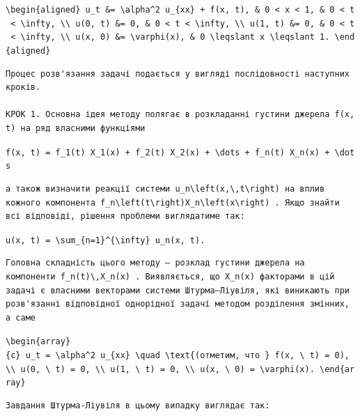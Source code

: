 \documentclass[
  ukrainian,
]{article}
\begin{document}
\texttt{\textbackslash{}begin\{aligned\}\ u\_t\ \&=\ \textbackslash{}alpha\^{}2\ u\_\{xx\}\ +\ f(x,\ t),\ \&\ 0\ \textless{}\ x\ \textless{}\ 1,\ \&\ 0\ \textless{}\ t\ \textless{}\ \textbackslash{}infty,\ \textbackslash{}\textbackslash{}\ u(0,\ t)\ \&=\ 0,\ \&\ 0\ \textless{}\ t\ \textless{}\ \textbackslash{}infty,\ \textbackslash{}\textbackslash{}\ u(1,\ t)\ \&=\ 0,\ \&\ 0\ \textless{}\ t\ \textless{}\ \textbackslash{}infty,\ \textbackslash{}\textbackslash{}\ u(x,\ 0)\ \&=\ \textbackslash{}varphi(x),\ \&\ 0\ \textbackslash{}leqslant\ x\ \textbackslash{}leqslant\ 1.\ \textbackslash{}end\{aligned\}}

\begin{verbatim}
Процес розв'язання задачі подається у вигляді послідовності наступних кроків.

КРОК 1. Основна ідея методу полягає в розкладанні густини джерела f(x, t) на ряд власними функціями
\end{verbatim}

\texttt{f(x,\ t)\ =\ f\_1(t)\ X\_1(x)\ +\ f\_2(t)\ X\_2(x)\ +\ \textbackslash{}dots\ +\ f\_n(t)\ X\_n(x)\ +\ \textbackslash{}dots}

\begin{verbatim}
а також визначити реакції системи u_n\left(x,\,t\right) на вплив кожного компонента f_n\left(t\right)X_n\left(x\right) . Якщо знайти всі відповіді, рішення проблеми виглядатиме так:
\end{verbatim}

\texttt{u(x,\ t)\ =\ \textbackslash{}sum\_\{n=1\}\^{}\{\textbackslash{}infty\}\ u\_n(x,\ t).}

\begin{verbatim}
Головна складність цього методу — розклад густини джерела на компоненти f_n(t)\,X_n(x) . Виявляється, що X_n(x) факторами в цій задачі є власними векторами системи Штурма–Ліувіля, які виникають при розв'язанні відповідної однорідної задачі методом розділення змінних, а саме
\end{verbatim}

\texttt{\textbackslash{}begin\{array\}\{c\}\ u\_t\ =\ \textbackslash{}alpha\^{}2\ u\_\{xx\}\ \textbackslash{}quad\ \textbackslash{}text\{(отметим,\ что\ \}\ f(x,\ \textbackslash{}\ t)\ =\ 0),\ \textbackslash{}\textbackslash{}\ u(0,\ \textbackslash{}\ t)\ =\ 0,\ \textbackslash{}\textbackslash{}\ u(1,\ \textbackslash{}\ t)\ =\ 0,\ \textbackslash{}\textbackslash{}\ u(x,\ \textbackslash{}\ 0)\ =\ \textbackslash{}varphi(x).\ \textbackslash{}end\{array\}}

\begin{verbatim}
Завдання Штурма-Ліувіля в цьому випадку виглядає так:
\end{verbatim}
\end{document}
